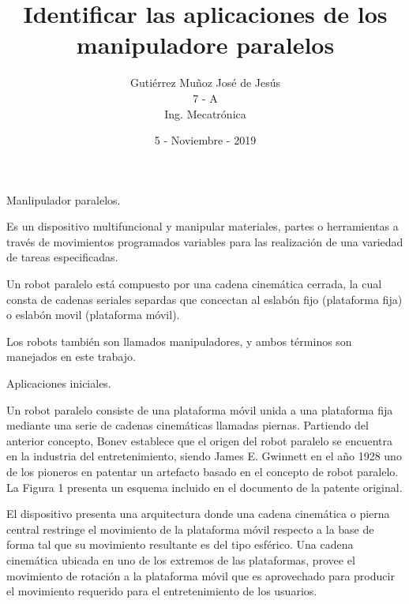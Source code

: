 \documentclass[a4paper,10pt]{article}
\title{Identificar las aplicaciones de los manipuladore paralelos}
\author{Gutiérrez Muñoz José de Jesús \\ 7 - A \\ Ing. Mecatrónica}
\date{5 - Noviembre - 2019}
\begin{document}
\maketitle

Manlipulador paralelos.

Es un dispositivo multifuncional y manipular materiales, partes o herramientas a través de movimientos programados variables para las realización de una variedad de tareas especificadas.

Un robot paralelo está compuesto por una cadena cinemática cerrada, la cual consta de cadenas seriales separdas que concectan al eslabón fijo (plataforma fija) o eslabón movil (plataforma móvil).

Los robots también son llamados manipuladores, y ambos términos son manejados en este trabajo.

Aplicaciones iniciales.

Un robot paralelo consiste de una plataforma móvil unida a una plataforma fija mediante una serie
de cadenas cinemáticas llamadas piernas. Partiendo del anterior concepto, Bonev establece que el
origen del robot paralelo se encuentra en la industria del entretenimiento, siendo James E. Gwinnett en
el año 1928 uno de los pioneros en patentar un artefacto basado en el concepto de robot paralelo. La
Figura 1 presenta un esquema incluido en el documento de la patente original.

El dispositivo 
presenta una arquitectura donde una cadena cinemática o pierna central restringe el movimiento de la
plataforma móvil respecto a la base de forma tal que su movimiento resultante es del tipo esférico. Una
cadena cinemática ubicada en uno de los extremos de las plataformas, provee el movimiento de rotación
a la plataforma móvil que es aprovechado para producir el movimiento requerido para el entretenimiento
de los usuarios.
\end{document}
